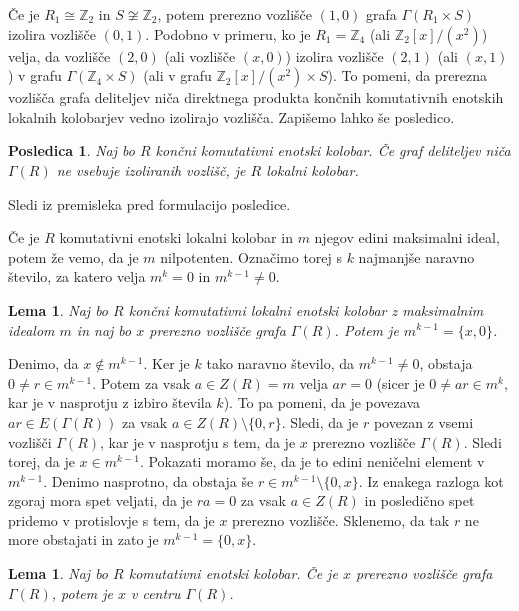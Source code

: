 \documentclass[a4paper, 12pt]{amsart}
\theoremstyle{definition} %
\theoremstyle{plain} %
\newtheorem{lema}[definicija]{Lema}
\newtheorem{posledica}[definicija]{Posledica}
\newcommand{\Z}{\mathbb Z}
\begin{document}
Če je $R_1\cong \Z_2$ in $S\not\cong \Z_2$, potem prerezno vozlišče $(1,0)$ grafa $\Gamma(R_1\times S) $ izolira vozlišče $(0,1)$. Podobno v primeru, ko je $R_1 = \Z_4$ (ali $\Z_2[x]/(x^2)$) velja, da vozlišče $(2,0)$ (ali vozlišče $(x,0)$) izolira vozlišče $(2,1)$ (ali $(x,1)$) v grafu $\Gamma(\Z_4 \times S)$ (ali v grafu $\Z_2[x]/(x^2) \times S$). To pomeni, da prerezna vozlišča grafa deliteljev niča direktnega produkta končnih komutativnih enotskih lokalnih kolobarjev vedno izolirajo vozlišča. Zapišemo lahko še posledico.

\begin{posledica}
Naj bo $R$ končni komutativni enotski kolobar. Če graf deliteljev niča $\Gamma(R)$ ne vsebuje izoliranih vozlišč, je $R$ lokalni kolobar.
\end{posledica}

\proof
Sledi iz premisleka pred formulacijo posledice.
\endproof

Če je $R$ komutativni enotski lokalni kolobar in $m$ njegov edini maksimalni ideal, potem že vemo, da je $m$ nilpotenten. Označimo torej s $k$ najmanjše naravno število, za katero velja $m^k = 0$ in $m^{k-1}\neq 0$.

\begin{lema}
\label{localRingCutVertex}
Naj bo $R$ končni komutativni lokalni enotski kolobar z maksimalnim idealom $m$ in naj bo $x$ prerezno vozlišče grafa $\Gamma(R)$. Potem je $m^{k-1} = \{x,0\}$.
\end{lema}

\proof
Denimo, da $x\notin m^{k-1}$. Ker je $k$ tako naravno število, da $m^{k-1} \neq 0$, obstaja $0\neq r \in m^{k-1}$. Potem za vsak $a\in Z(R)=m$ velja $ar = 0 $ (sicer je $0\neq ar \in m^k$, kar je v nasprotju z izbiro števila $k$). To pa pomeni, da je povezava $ar \in E(\Gamma(R))$ za vsak $a\in Z(R)\setminus \{0,r\}$. Sledi, da je $r$ povezan z vsemi vozlišči $\Gamma(R)$, kar je v nasprotju s tem, da je $x$ prerezno vozlišče $\Gamma(R)$. Sledi torej, da je $x\in m^{k-1}$. Pokazati moramo še, da je to edini neničelni element v $m^{k-1}$. Denimo nasprotno, da obstaja še $r\in m^{k-1} \setminus \{0,x\}$. Iz enakega razloga kot zgoraj mora spet veljati, da je $ra = 0$ za vsak $a\in Z(R)$ in posledično spet pridemo v protislovje s tem, da je $x$ prerezno vozlišče. Sklenemo, da tak $r$ ne more obstajati in zato je $m^{k-1} = \{0,x\}$.
\endproof

\begin{lema}
Naj bo $R$ komutativni enotski kolobar. Če je $x$ prerezno vozlišče grafa $\Gamma(R)$, potem  je $x$ v centru $\Gamma(R)$.
\end{lema}
\end{document}
